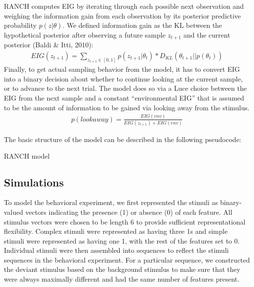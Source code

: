 \documentclass[10pt, letterpaper]{article}
\begin{document}
RANCH computes EIG by iterating through each possible next observation
and weighing the information gain from each observation by its posterior
predictive probability \(p(z|\theta)\). We defined information gain as
the KL between the hypothetical posterior after observing a future
sample \(z_{t+1}\) and the current posterior (Baldi \& Itti, 2010):
\begin{eqnarray}
EIG(z_{t+1}) = \sum_{z_{t+1} \in [0,1]} p(z_{t+1}|\theta_t) * D_{KL}(\theta_{t+1} || p(\theta_t))
\end{eqnarray} Finally, to get actual sampling behavior from the model,
it has to convert EIG into a binary decision about whether to continue
looking at the current sample, or to advance to the next trial. The
model does so via a Luce choice between the EIG from the next sample and
a constant ``environmental EIG'' that is assumed to be the amount of
information to be gained via looking away from the stimulus.
\begin{eqnarray}
p(look away) = \frac{EIG(env)}{EIG(z_{t+1})+EIG(env)}
\end{eqnarray}

The basic structure of the model can be described in the following
pseudocode:

\begin{algorithm}
  \caption*{RANCH model}\label{msn}
  \begin{algorithmic}
  \NoDo{}
    \NoThen{}
    \EndIf
    \EndWhile
  \EndFor
\end{algorithmic}
  \end{algorithm}

\hypertarget{simulations}{%
\subsection{Simulations}\label{simulations}}

To model the behavioral experiment, we first represented the stimuli as
binary-valued vectors indicating the presence (1) or absence (0) of each
feature. All stimulus vectors were chosen to be length 6 to provide
sufficient representational flexibility. Complex stimuli were
represented as having three 1s and simple stimuli were represented as
having one 1, with the rest of the features set to 0. Individual stimuli
were then assembled into sequences to reflect the stimuli sequences in
the behavioral experiment. For a particular sequence, we constructed the
deviant stimulus based on the background stimulus to make sure that they
were always maximally different and had the same number of features
present.
\end{document}

